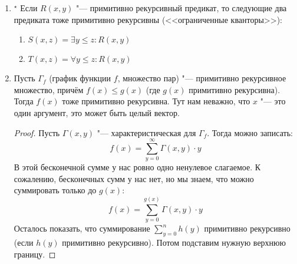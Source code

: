 \begin{enumerate}
\begin{proof}
			Теперь определяем модуль рекурсивно примитивно:
			\begin{align*}
			0     &\bmod n = 0 \\
			(x+1) &\bmod n = h(x \mod n, n)
			\end{align*}
		\end{proof}
	\item$^\star$\label{limitedQuantification}
		Если $R(x, y)$ "--- примитивно рекурсивный предикат, то следующие два предиката тоже примитивно рекурсивны (<<ограниченные кванторы>>):
		\begin{enumerate}
			\item $S(x, z) = \exists y \le z \colon R(x, y)$
			\item $T(x, z) = \forall y \le z \colon R(x, y)$
		\end{enumerate}
	\item
		Пусть $\Gamma_f$ (график функции $f$, множество пар) "--- примитивно рекурсивное множество,
		причём $f(x) \le g(x)$ (где $g(x)$ примитивно рекурсивна).
		Тогда $f(x)$ тоже примитивно рекурсивна.
		Тут нам неважно, что $x$ "--- это один аргумент, это может быть целый вектор.
		\begin{proof}
			Пусть $\Gamma(x, y)$ "--- характеристическая для $\Gamma_f$.
			Тогда можно записать:
			\[
				f(x) = \sum_{y=0}^\infty \Gamma(x, y) \cdot y
			\]
			В этой бесконечной сумме у нас ровно одно ненулевое слагаемое.
			К сожалению, бесконечных сумм у нас нет, но мы знаем, что можно суммировать только до $g(x)$:
			\[
				f(x) = \sum_{y=0}^{g(x)} \Gamma(x, y) \cdot y
			\]
			Осталось показать, что суммирование $\sum_{y=0}^n h(y)$ примитивно рекурсивно (если $h(y)$ примитивно рекурсивно).
			Потом подставим нужную верхнюю границу.


\end{proof}
\end{enumerate}
